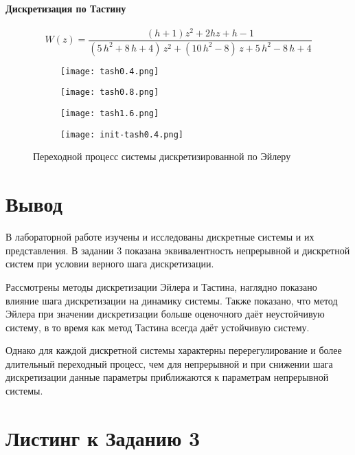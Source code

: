     \paragraph*{Дискретизация по Тастину}
    \begin{equation}
        W(z) = \dfrac{(h+1)z^2 + 2hz + h -1}{\left(5\,h^2+8\,h+4\right)\,z^2+\left(10\,h^2-8\right)\,z+5\,h^2-8\,h+4}
    \end{equation}
    \begin{figure}[H]
        \centering
        \begin{subfigure}{0.49\linewidth}
            \texttt{[image: tash0.4.png]}
        \end{subfigure}
        \begin{subfigure}{0.49\linewidth}
            \texttt{[image: tash0.8.png]}
        \end{subfigure}
        \begin{subfigure}{0.49\linewidth}
            \texttt{[image: tash1.6.png]}
        \end{subfigure}
        \begin{subfigure}{0.49\linewidth}
            \texttt{[image: init-tash0.4.png]}
        \end{subfigure}
        \caption{Переходной процесс системы дискретизированной по Эйлеру}
    \end{figure}

    \section*{Вывод}
    В лабораторной работе изучены и исследованы дискретные системы и их представления.
    В задании 3 показана эквивалентность непрерывной и дискретной систем при условии верного шага дискретизации.

    Рассмотрены методы дискретизации Эйлера и Тастина, наглядно показано влияние шага дискретизации на динамику системы.
    Также показано, что метод Эйлера при значении дискретизации больше оценочного даёт неустойчивую систему, в то время
    как метод Тастина всегда даёт устойчивую систему.

    Однако для каждой дискретной системы характерны перерегулирование и более длительный переходный процесс, чем
    для непрерывной и при снижении шага дискретизации данные параметры приближаются к параметрам непрерывной системы.
    \section*{Листинг к Заданию 3}
    \inputminted[linenos, frame=single, breakanywhere]{octave}{../src/L4T3.m}


